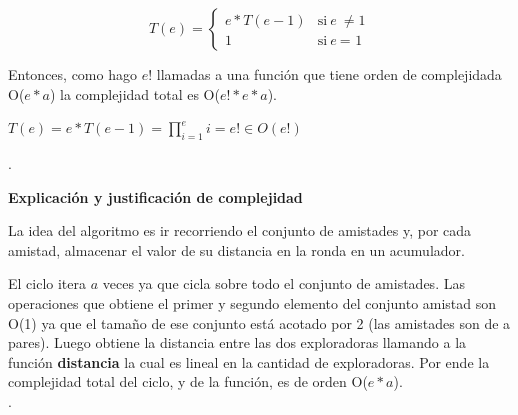 \documentclass[11pt]{article}
\begin{document}
\vspace{1mm}

\[ T(e) = 
  \begin{cases} 
    e * T(e-1) & \mbox{si} \ e \ \neq \mbox{1} \\
    1 & \mbox{si} \ e \ \mbox{= 1} 
  \end{cases}
\]

\vspace{2mm}

Entonces, como hago $e!$  llamadas a una función que tiene orden de complejidada O($e*a$) la complejidad 
total es O($e!*e*a$).

\begin{center}
$T(e) = e * T(e-1) = \prod_{i=1}^{e} i = e! \in O(e!)$
\end{center}

\vspace{5mm}
\noindent\makebox[\linewidth]{\rule{17cm}{0.4pt}}

.
\\

\vspace{3mm}
\begin{center}
\textbf{Explicación y justificación de complejidad} \\ 
\end{center} 
La idea del algoritmo es ir recorriendo el conjunto de amistades y, por cada amistad, almacenar el valor de 
su distancia en la ronda en un acumulador.

El ciclo itera $a$ veces ya que cicla sobre todo el conjunto de amistades. Las operaciones que obtiene el 
primer y segundo elemento del conjunto amistad son O(1) ya que el tamaño de ese conjunto está acotado por 
2 (las amistades son de a pares). Luego obtiene la distancia entre las dos exploradoras llamando a la 
función \textbf{distancia} la cual es lineal en la cantidad de exploradoras. Por ende la complejidad
total del ciclo, y de la función, es de orden O($e*a$). \\
\noindent\makebox[\linewidth]{\rule{17cm}{0.4pt}}
.
\\
\end{document}
